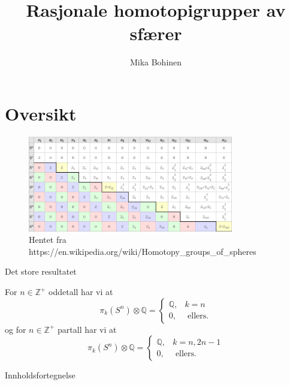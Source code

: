 \documentclass[UKenglish]{beamer}
\author{Mika Bohinen}
\title{Rasjonale homotopigrupper av sfærer}
\begin{document}
\section{Oversikt}


%
%

\begin{frame}
\begin{figure}[]
    \centering
    \includegraphics[width=0.8\textwidth]{figures/homotopigrupper.png}
    \caption{Hentet fra https://en.wikipedia.org/wiki/Homotopy\_groups\_of\_spheres}
    \label{fig:}
\end{figure}
\end{frame}

\begin{frame}{Det store resultatet}
   \begin{theorem}
      For \( n\in \mathbb{Z}^+ \) oddetall har vi at
      \begin{equation}
          \pi_k(S^n)\otimes \mathbb{Q} =
          \begin{cases}
              \mathbb{Q}, & k = n\\
              0, &  \text{ ellers.}
              
          \end{cases}
      \end{equation}
    og for \( n\in \mathbb{Z}^+ \) partall har vi at
    \begin{equation}
       \pi_k(S^n)\otimes \mathbb{Q} =
       \begin{cases}
           \mathbb{Q}, & k=n, 2n-1\\
           0, & \text{ ellers.}
           
       \end{cases}
    \end{equation}
  \end{theorem}
\end{frame}
\begin{frame}{Innholdsfortegnelse}
    \tableofcontents
\end{frame}
\end{document}
